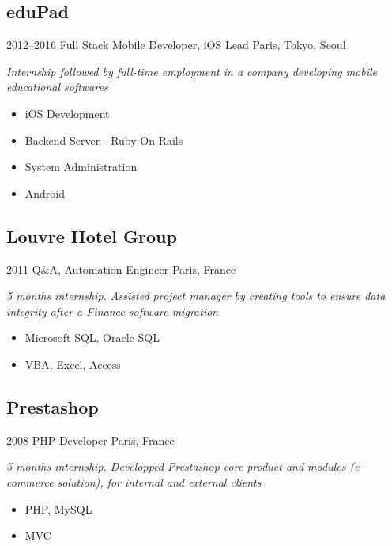 \documentclass[]{template/friggeri-cv} %
\begin{document}
\subsection{eduPad}
\begin{entrylist}


\entry
{2012--2016}
{Full Stack Mobile Developer, iOS Lead}
{Paris, Tokyo, Seoul}
{\emph{Internship followed by full-time employment in a company developing mobile educational softwares}\\
\begin{itemize}
\item{iOS Development} 
\item{Backend Server - Ruby On Rails} 
\item{System Administration} 
\item{Android} 
\end{itemize}
}

\end{entrylist}



\subsection{Louvre Hotel Group}
\begin{entrylist}
\entry
{2011}
{Q\&A, Automation Engineer}
{Paris, France}
{\emph{5 months internship. Assisted project manager by creating tools to ensure data integrity after a Finance software migration}

\begin{itemize}
\item {Microsoft SQL, Oracle SQL}
\item {VBA, Excel, Access}

\end{itemize}
}
\end{entrylist}

\goodbreak
\subsection{Prestashop}
\begin{entrylist}
\entry
{2008}
{PHP Developer}
{Paris, France}
{\emph{5 months internship. Developped Prestashop core product and modules (e-commerce solution), for internal and external clients}

\begin{itemize}

\item {PHP, MySQL}
\item {MVC}

\end{itemize}
}
\end{entrylist}
\end{document}
